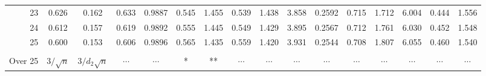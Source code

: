 \documentclass{article}
\begin{document}
\begin{tabular}{|r|c|c|c|c|c|c|c|c|c|c|c|c|c|c|c|}
    23 & 0.626 & 0.162 & 0.633 & 0.9887 & 0.545 & 1.455 & 0.539 & 1.438
       & 3.858 & 0.2592 & 0.715 & 1.712 & 6.004 & 0.444 & 1.556 \\
    24 & 0.612 & 0.157 & 0.619 & 0.9892 & 0.555 & 1.445 & 0.549 & 1.429
       & 3.895 & 0.2567 & 0.712 & 1.761 & 6.030 & 0.452 & 1.548 \\
    25 & 0.600 & 0.153 & 0.606 & 0.9896 & 0.565 & 1.435 & 0.559 & 1.420
       & 3.931 & 0.2544 & 0.708 & 1.807 & 6.055 & 0.460 & 1.540 \\
       &       &        &       &       &       &       &       &
       &       &        &       &       &       &       &       \\
    Over 25 & $3/\sqrt{n}$ & $3/d_2\sqrt{n}$ & $\cdots$ & $\cdots$ & * & ** 
       & $\cdots$ & $\cdots$ & $\cdots$ & $\cdots$ & $\cdots$ & $\cdots$ 
       & $\cdots$ & $\cdots$ & $\cdots$ \\ \hline
\end{tabular}
\end{document}
